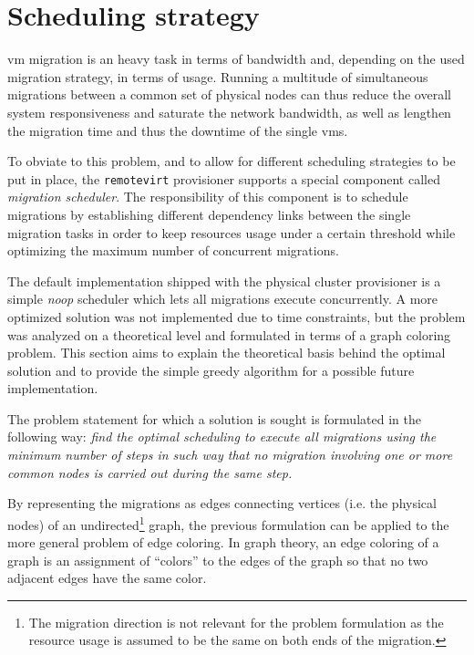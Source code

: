 \section{Scheduling strategy}
\label{sec:scheduling-strategy}

\gls{vm} migration is an heavy task in terms of bandwidth and, depending on the used migration strategy, in terms of  usage. Running a multitude of simultaneous migrations between a common set of physical nodes can thus reduce the overall system responsiveness and saturate the network bandwidth, as well as lengthen the migration time and thus the downtime of the single \glspl{vm}.

To obviate to this problem, and to allow for different scheduling strategies to be put in place, the \texttt{remotevirt} provisioner supports a special component called \emph{migration scheduler}. The responsibility of this component is to schedule migrations by establishing different dependency links between the single migration tasks in order to keep resources usage under a certain threshold while optimizing the maximum number of concurrent migrations.

The default implementation shipped with the physical cluster provisioner is a simple \emph{noop} scheduler which lets all migrations execute concurrently. A more optimized solution was not implemented due to time constraints, but the problem was analyzed on a theoretical level and formulated in terms of a graph coloring problem. This section aims to explain the theoretical basis behind the optimal solution and to provide the simple greedy algorithm for a possible future implementation.

The problem statement for which a solution is sought is formulated in the following way: \emph{find the optimal scheduling to execute all migrations using the minimum number of steps in such way that no migration involving one or more common nodes is carried out during the same step.}

By representing the migrations as edges connecting vertices (i.e. the physical nodes) of an undirected\footnote{The migration direction is not relevant for the problem formulation as the resource usage is assumed to be the same on both ends of the migration.} graph, the previous formulation can be applied to the more general problem of edge coloring. In graph theory, an edge coloring of a graph is an assignment of “colors” to the edges of the graph so that no two adjacent edges have the same color.

